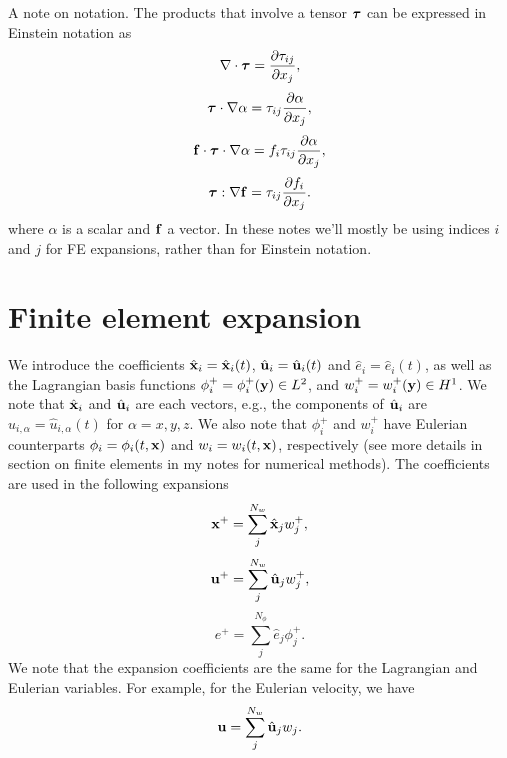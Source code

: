 \documentclass[11pt]{article}
\begin{document}
A note on notation. The products that involve a tensor $\bm \tau$ can be expressed in Einstein notation as
\begin{equation}
    \nabla \cdot \bm \tau = \frac{\partial \tau_{ij}}{\partial x_j},
\end{equation}
\begin{equation}
    \bm \tau \cdot \nabla \alpha = \tau_{ij} \frac{\partial \alpha}{\partial x_j},
\end{equation}
\begin{equation}
    \mathbf{f} \cdot \bm \tau \cdot \nabla \alpha = f_i \tau_{ij} \frac{\partial \alpha}{\partial x_j},
\end{equation}
\begin{equation}
    \bm \tau : \nabla \mathbf{f} = \tau_{ij} \frac{\partial f_i}{\partial x_j}.
\end{equation}
where $\alpha$ is a scalar and $\mathbf{f}$ a vector. In these notes we'll mostly be using indices $i$ and $j$ for FE expansions, rather than for Einstein notation.

\section{Finite element expansion}
We introduce the coefficients $\hat{\mathbf{x}}_i = \hat{\mathbf{x}}_i(t)$, $\hat{\mathbf{u}}_i = \hat{\mathbf{u}}_i(t)$ and $\hat{e}_i = \hat{e}_i(t)$, as well as the Lagrangian basis functions $\phi^+_i = \phi^+_i(\mathbf{y}) \in L^2$, and $w^+_i = w^+_i(\mathbf{y}) \in H^1$. We note that $\hat{\mathbf{x}}_i$ and $\hat{\mathbf{u}}_i$ are each vectors, e.g., the components of $\hat{\mathbf{u}}_i$ are $\hat{u}_{i,\alpha} = \hat{u}_{i,\alpha}(t)$ for $\alpha = x,y,z$. We also note that $\phi^+_i$ and $w^+_i$ have Eulerian counterparts $\phi_i = \phi_i(t,\mathbf{x})$ and $w_i = w_i(t,\mathbf{x})$, respectively (see more details in section on finite elements in my notes for numerical methods). The coefficients are used in the following expansions
\begin{equation}
    \mathbf{x}^+ = \sum_j^{N_w} \hat{\mathbf{x}}_j w^+_j,
\end{equation}
\begin{equation}
    \mathbf{u}^+ = \sum_j^{N_w} \hat{\mathbf{u}}_j w^+_j,
\end{equation}
\begin{equation}
    e^+ = \sum_j^{N_\phi} \hat{e}_j \phi^+_j.
\end{equation}
We note that the expansion coefficients are the same for the Lagrangian and Eulerian variables. For example, for the Eulerian velocity, we have
\begin{equation}
    \mathbf{u} = \sum_j^{N_w} \hat{\mathbf{u}}_j w_j.
\end{equation}
\end{document}
